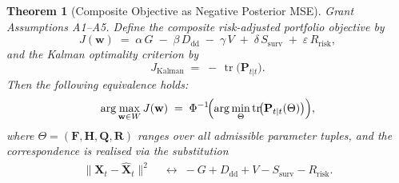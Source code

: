 \documentclass[12pt,openany]{book}
\numberwithin{equation}{chapter}
\theoremstyle{plain}
\newtheorem{theorem}{Theorem}[chapter]
\theoremstyle{definition}
\theoremstyle{remark}
\DeclareMathOperator{\tr}{tr}
\def\mathcal#1{#1}%
\begin{document}
\begin{theorem}[Composite Objective as Negative Posterior MSE]
\label{thm:objective-mse}
Grant Assumptions \textup{A1}--\textup{A5}.
Define the composite risk-adjusted portfolio objective by
\begin{equation}
  J(\mathbf{w}) \;=\;
    \alpha\, G
    \;-\; \beta\, D_{\mathrm{dd}}
    \;-\; \gamma\, V
    \;+\; \delta\, S_{\mathrm{surv}}
    \;+\; \varepsilon\, R_{\mathrm{risk}},
  \label{eq:composite-objective}
\end{equation}
and the Kalman optimality criterion by
\begin{equation}
  J_{\mathrm{Kalman}} \;=\; -\,\tr\!\bigl(\mathbf{P}_{t|t}\bigr).
  \label{eq:kalman-objective}
\end{equation}
Then the following equivalence holds:
\begin{equation}
  \arg\max_{\mathbf{w}\in\mathcal{W}} J(\mathbf{w})
  \;=\;
  \Phi^{-1}\!\Bigl(
    \arg\min_{\Theta} \tr\!\bigl(\mathbf{P}_{t|t}(\Theta)\bigr)
  \Bigr),
  \label{eq:equivalence-statement}
\end{equation}
where $\Theta = (\mathbf{F},\mathbf{H},\mathbf{Q},\mathbf{R})$
ranges over all admissible parameter tuples, and the correspondence
is realised via the substitution
\begin{align}
  \bigl\|\mathbf{X}_t - \hat{\mathbf{X}}_t\bigr\|^2
  &\;\longleftrightarrow\;
  -G + D_{\mathrm{dd}} + V - S_{\mathrm{surv}} - R_{\mathrm{risk}}.
  \label{eq:mse-substitution}
\end{align}
\end{theorem}
\end{document}
